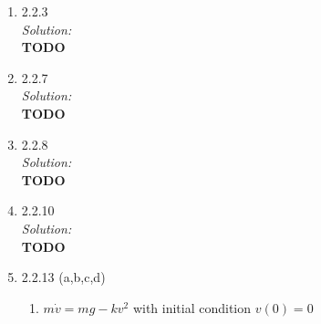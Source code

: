 \documentclass[10pt]{amsart}
\theoremstyle{nonumberplain}
\begin{document}
\begin{enumerate}[label={\bf {\arabic*}:}]
\item 2.2.3 \\
\textit{Solution:} \\
\textbf{TODO} \\

\item 2.2.7 \\
\textit{Solution:} \\
\textbf{TODO} \\

\item 2.2.8 \\
\textit{Solution:} \\
\textbf{TODO} \\

\item 2.2.10 \\
\textit{Solution:} \\
\textbf{TODO} \\

\item 2.2.13 (a,b,c,d) \\
\begin{enumerate}
\item $m \dot v = mg - kv^2$ with initial condition $v(0) = 0$ \\


\end{enumerate}
\end{enumerate}
\end{document}
